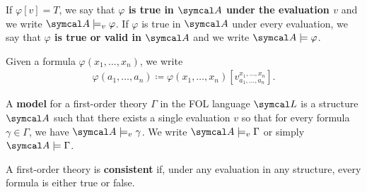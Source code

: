 \begin{definition}
  If \( \varphi[v] = T \), we say that \textbf{\( \varphi \) is true in \( \Cal{A} \) under the evaluation \( v \)} and we write \( \Cal{A} \models_v \varphi \). If \( \varphi \) is true in \( \Cal{A} \) under every evaluation, we say that \textbf{\( \varphi \) is true or valid in \( \Cal{A} \)} and we write \( \Cal{A} \models \varphi \).

  Given a formula \( \varphi(x_1, \ldots, x_n) \), we write
  \begin{align*}
    \varphi(a_1, \ldots, a_n) \coloneqq \varphi(x_1, \ldots, x_n)[v_{a_1, \ldots, a_n}^{x_1, \ldots, x_n}].
  \end{align*}
\end{definition}

\begin{definition}\label{def:first_order_model}\cite[definition 4.4]{Nerode2012}
  A \textbf{model} for a first-order theory \( \Gamma \) in the FOL language \( \Cal{L} \) is a structure \( \Cal{A} \) such that there exists a single evaluation \( v \) so that for every formula \( \gamma \in \Gamma \), we have \( \Cal{A} \models_v \gamma \). We write \( \Cal{A} \models_v \Gamma \) or simply \( \Cal{A} \models \Gamma \).
\end{definition}

\begin{definition}\label{def:first_order_consistent}
  A first-order theory is \textbf{consistent} if, under any evaluation in any structure, every formula is either true or false.
\end{definition}

